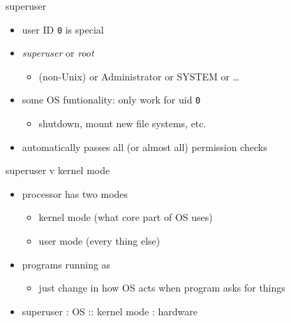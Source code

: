 \begin{frame}{superuser}
\begin{itemize}
\item user ID \texttt{0} is special
\item \textit{superuser} or \textit{root}
    \begin{itemize}
    \item (non-Unix) or Administrator or SYSTEM or \ldots
    \end{itemize}
\vspace{.5cm}
\item some OS funtionality: only work for uid \texttt{0}
    \begin{itemize}
    \item shutdown, mount new file systems, etc.
    \end{itemize}
\item automatically passes all (or almost all) permission checks
\end{itemize}
\end{frame}

\begin{frame}{superuser v kernel mode}
    \begin{itemize}
    \item processor has two modes
	\begin{itemize}
	\item kernel mode (what core part of OS uses)
	\item user mode (every thing else)
	\end{itemize}
    \item programs running as 
        \begin{itemize}
        \item just change in how OS acts when program asks for things
        \end{itemize}
    \vspace{.5cm}
    \item superuser : OS :: kernel mode : hardware
    \end{itemize}
\end{frame}
